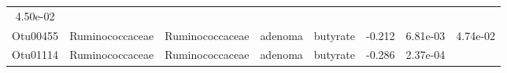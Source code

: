\documentclass[11pt,]{article}
\begin{document}
\begin{longtable}[]{@{}cccccccc@{}}
\begin{minipage}[t]{0.08\columnwidth}
4.50e-02\strut
\end{minipage}\tabularnewline
\begin{minipage}[t]{0.08\columnwidth}\centering\strut
Otu00455\strut
\end{minipage} & \begin{minipage}[t]{0.15\columnwidth}\centering\strut
Ruminococcaceae\strut
\end{minipage} & \begin{minipage}[t]{0.15\columnwidth}\centering\strut
Ruminococcaceae\strut
\end{minipage} & \begin{minipage}[t]{0.08\columnwidth}\centering\strut
adenoma\strut
\end{minipage} & \begin{minipage}[t]{0.09\columnwidth}\centering\strut
butyrate\strut
\end{minipage} & \begin{minipage}[t]{0.07\columnwidth}\centering\strut
-0.212\strut
\end{minipage} & \begin{minipage}[t]{0.08\columnwidth}\centering\strut
6.81e-03\strut
\end{minipage} & \begin{minipage}[t]{0.08\columnwidth}\centering\strut
4.74e-02\strut
\end{minipage}\tabularnewline
\begin{minipage}[t]{0.08\columnwidth}\centering\strut
Otu01114\strut
\end{minipage} & \begin{minipage}[t]{0.15\columnwidth}\centering\strut
Ruminococcaceae\strut
\end{minipage} & \begin{minipage}[t]{0.15\columnwidth}\centering\strut
Ruminococcaceae\strut
\end{minipage} & \begin{minipage}[t]{0.08\columnwidth}\centering\strut
adenoma\strut
\end{minipage} & \begin{minipage}[t]{0.09\columnwidth}\centering\strut
butyrate\strut
\end{minipage} & \begin{minipage}[t]{0.07\columnwidth}\centering\strut
-0.286\strut
\end{minipage} & \begin{minipage}[t]{0.08\columnwidth}\centering\strut
2.37e-04\strut
\end{minipage} & \begin{minipage}[t]{0.08\columnwidth}\centering\strut

\end{minipage}
\end{longtable}
\end{document}
